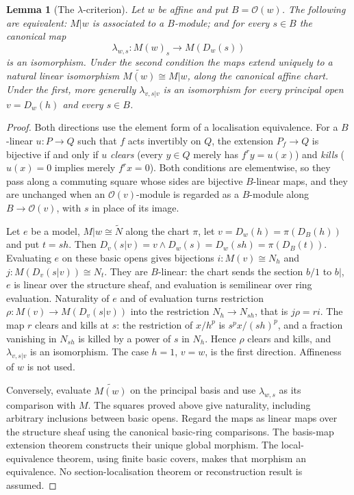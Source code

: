 \documentclass[11pt]{amsart}
\newtheorem{lemma}[theorem]{Lemma}
\theoremstyle{definition}\newtheorem{definition}[theorem]{Definition}
\theoremstyle{remark}\newtheorem{remark}[theorem]{Remark}
\newcommand{\OO}{\mathcal O}
\begin{document}
\begin{lemma}[The $\lambda$-criterion]\label{lem:lambda-criterion}
Let $w$ be affine and put $B=\OO(w)$. The following are equivalent:
$M|w$ is associated to a $B$-module; and for every $s\in B$ the
canonical map
\[
 \lambda_{w,s}:M(w)_s\longrightarrow M(D_w(s))
\]
is an isomorphism. Under the second condition the maps extend uniquely
to a natural linear isomorphism
$\widetilde{M(w)}\cong M|w$, along the canonical affine chart. Under
the first, more generally $\lambda_{v,s|v}$ is an isomorphism for every
principal open $v=D_w(h)$ and every $s\in B$.
\end{lemma}
\begin{proof}
Both directions use the element form of a localisation equivalence.
For a $B$-linear $u:P\to Q$ such that $f$ acts invertibly on $Q$, the
extension $P_f\to Q$ is bijective if and only if $u$ \emph{clears}
(every $y\in Q$ merely has $f^ry=u(x)$) and \emph{kills} ($u(x)=0$
implies merely $f^rx=0$). Both conditions are elementwise, so they pass
along a commuting square whose sides are bijective $B$-linear maps, and
they are unchanged when an $\OO(v)$-module is regarded as a $B$-module
along $B\to\OO(v)$, with $s$ in place of its image.

Let $e$ be a model, $M|w\cong\widetilde N$ along the chart $\pi$, let
$v=D_w(h)=\pi(D_B(h))$ and put $t=sh$. Then
$D_v(s|v)=v\wedge D_w(s)=D_w(sh)=\pi(D_B(t))$. Evaluating $e$ on these
basic opens gives bijections $i:M(v)\cong N_h$ and
$j:M(D_v(s|v))\cong N_t$. They are $B$-linear: the chart sends the
section $b/1$ to $b|$, $e$ is linear over the structure sheaf, and
evaluation is semilinear over ring evaluation. Naturality of $e$ and of
evaluation turns restriction $\rho:M(v)\to M(D_v(s|v))$ into the
restriction $N_h\to N_{sh}$, that is $j\rho=ri$. The map $r$ clears
and kills at $s$: the restriction of $x/h^p$ is $s^px/(sh)^p$, and a
fraction vanishing in $N_{sh}$ is killed by a power of $s$ in $N_h$.
Hence $\rho$ clears and kills, and $\lambda_{v,s|v}$ is an isomorphism.
The case $h=1$, $v=w$, is the first direction. Affineness of $w$ is
not used.

Conversely, evaluate $\widetilde{M(w)}$ on the principal basis and
use $\lambda_{w,s}$ as its comparison with $M$. The squares proved
above give naturality, including arbitrary inclusions between basic
opens. Regard the maps as linear maps over the structure sheaf using
the canonical basic-ring comparisons. The basis-map extension theorem
constructs their unique global morphism. The local-equivalence theorem,
using finite basic covers, makes that morphism an equivalence.
No section-localisation theorem or reconstruction result is assumed.
\end{proof}
\end{document}
